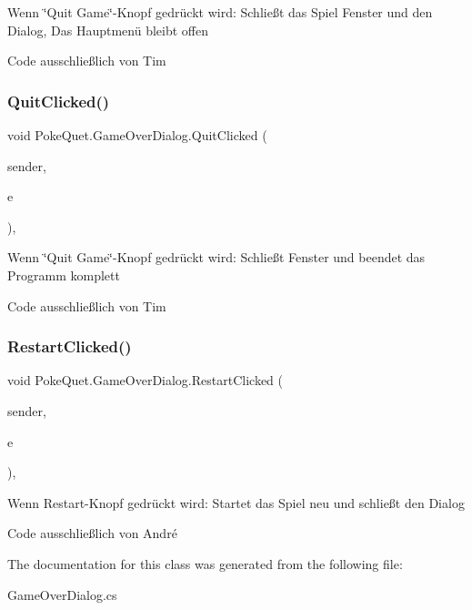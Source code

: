 Wenn \char`\"{}\+Quit Game\char`\"{}-\/\+Knopf gedrückt wird\+: Schließt das Spiel Fenster und den Dialog, Das Hauptmenü bleibt offen 

Code ausschließlich von Tim\mbox{\label{class_poke_quet_1_1_game_over_dialog_a1f55fe2f8582123f180ceee6d4ea9150}} 
\subsubsection{\texorpdfstring{Quit\+Clicked()}{QuitClicked()}}
{\footnotesize\ttfamily void Poke\+Quet.\+Game\+Over\+Dialog.\+Quit\+Clicked (\begin{DoxyParamCaption}\item[{object}]{sender,  }\item[{Event\+Args}]{e }\end{DoxyParamCaption})\hspace{0.3cm}{\ttfamily [inline]}, {\ttfamily [protected]}}



Wenn \char`\"{}\+Quit Game\char`\"{}-\/\+Knopf gedrückt wird\+: Schließt Fenster und beendet das Programm komplett 

Code ausschließlich von Tim\mbox{\label{class_poke_quet_1_1_game_over_dialog_aa12eeeb856f3efec7e3bfff392a59af5}} 
\subsubsection{\texorpdfstring{Restart\+Clicked()}{RestartClicked()}}
{\footnotesize\ttfamily void Poke\+Quet.\+Game\+Over\+Dialog.\+Restart\+Clicked (\begin{DoxyParamCaption}\item[{object}]{sender,  }\item[{Event\+Args}]{e }\end{DoxyParamCaption})\hspace{0.3cm}{\ttfamily [inline]}, {\ttfamily [protected]}}



Wenn Restart-\/\+Knopf gedrückt wird\+: Startet das Spiel neu und schließt den Dialog 

Code ausschließlich von André

The documentation for this class was generated from the following file\+:\begin{DoxyCompactItemize}
\item 
Game\+Over\+Dialog.\+cs\end{DoxyCompactItemize}
